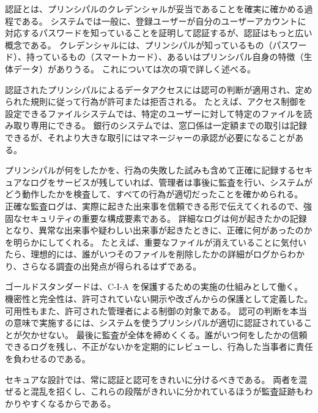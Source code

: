 \documentclass[uplatex]{jsarticle}
\begin{document}
認証とは、プリンシパルのクレデンシャルが妥当であることを確実に確かめる過程である。
システムでは一般に、登録ユーザーが自分のユーザーアカウントに対応するパスワードを知っていることを証明して認証するが、認証はもっと広い概念である。
クレデンシャルには、プリンシパルが知っているもの（パスワード）、持っているもの（スマートカード）、あるいはプリンシパル自身の特徴（生体データ）がありうる。
これについては次の項で詳しく述べる。

認証されたプリンシパルによるデータアクセスには認可の判断が適用され、定められた規則に従って行為が許可または拒否される。
たとえば、アクセス制御を設定できるファイルシステムでは、特定のユーザーに対して特定のファイルを読み取り専用にできる。
銀行のシステムでは、窓口係は一定額までの取引は記録できるが、それより大きな取引にはマネージャーの承認が必要になることがある。

プリンシパルが何をしたかを、行為の失敗した試みも含めて正確に記録するセキュアなログをサービスが残していれば、管理者は事後に監査を行い、システムがどう動作したかを検査して、すべての行為が適切だったことを確かめられる。
正確な監査ログは、実際に起きた出来事を信頼できる形で伝えてくれるので、強固なセキュリティの重要な構成要素である。
詳細なログは何が起きたかの記録となり、異常な出来事や疑わしい出来事が起きたときに、正確に何があったのかを明らかにしてくれる。
たとえば、重要なファイルが消えていることに気付いたら、理想的には、誰がいつそのファイルを削除したかの詳細がログからわかり、さらなる調査の出発点が得られるはずである。

ゴールドスタンダードは、C-I-A を保護するための実施の仕組みとして働く。
機密性と完全性は、許可されていない開示や改ざんからの保護として定義した。
可用性もまた、許可された管理者による制御の対象である。
認可の判断を本当の意味で実施するには、システムを使うプリンシパルが適切に認証されていることが欠かせない。
最後に監査が全体を締めくくる。誰がいつ何をしたかの信頼できるログを残し、不正がないかを定期的にレビューし、行為した当事者に責任を負わせるのである。

セキュアな設計では、常に認証と認可をきれいに分けるべきである。
両者を混ぜると混乱を招くし、これらの段階がきれいに分かれているほうが監査証跡もわかりやすくなるからである。
\end{document}
